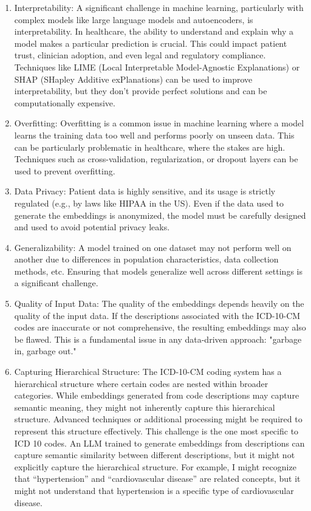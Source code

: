 \documentclass{bmcart}
\begin{document}
\begin{enumerate}
\item Interpretability: A significant challenge in machine learning, particularly with complex models like large language models and autoencoders, is interpretability. In healthcare, the ability to understand and explain why a model makes a particular prediction is crucial. This could impact patient trust, clinician adoption, and even legal and regulatory compliance. Techniques like LIME (Local Interpretable Model-Agnostic Explanations) or SHAP (SHapley Additive exPlanations) can be used to improve interpretability, but they don't provide perfect solutions and can be computationally expensive.
\item Overfitting: Overfitting is a common issue in machine learning where a model learns the training data too well and performs poorly on unseen data. This can be particularly problematic in healthcare, where the stakes are high. Techniques such as cross-validation, regularization, or dropout layers can be used to prevent overfitting.
\item Data Privacy: Patient data is highly sensitive, and its usage is strictly regulated (e.g., by laws like HIPAA in the US). Even if the data used to generate the embeddings is anonymized, the model must be carefully designed and used to avoid potential privacy leaks.
\item Generalizability: A model trained on one dataset may not perform well on another due to differences in population characteristics, data collection methods, etc. Ensuring that models generalize well across different settings is a significant challenge.
\item Quality of Input Data: The quality of the embeddings depends heavily on the quality of the input data. If the descriptions associated with the ICD-10-CM codes are inaccurate or not comprehensive, the resulting embeddings may also be flawed. This is a fundamental issue in any data-driven approach: "garbage in, garbage out."
\item Capturing Hierarchical Structure: The ICD-10-CM coding system has a hierarchical structure where certain codes are nested within broader categories. While embeddings generated from code descriptions may capture semantic meaning, they might not inherently capture this hierarchical structure. Advanced techniques or additional processing might be required to represent this structure effectively. This challenge is the one most specific to ICD 10 codes. An LLM trained to generate embeddings from descriptions can capture semantic similarity between different descriptions, but it might not explicitly capture the hierarchical structure. For example, I might recognize that ``hypertension'' and ``cardiovascular disease'' are related concepts, but it might not understand that hypertension is a
specific type of cardiovascular disease.
\end{enumerate}
\end{document}
